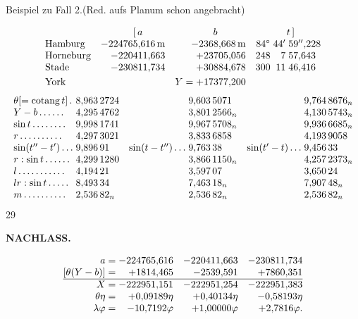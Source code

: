 \medskip
{\centering Beispiel zu Fall 2.\quad (Red. aufs Planum schon angebracht)\par}
\[
\begin{array}{@{}l@{\quad}r@{\quad}r@{\quad}r@{\;}r@{\;}l@{}}
 &\multicolumn{1}{c}{[\,a}&\multicolumn{1}{c}{b}
 &\multicolumn{3}{c@{}}{t\,]}\\
 \text{Hamburg}&-224765{,}616\,\mathrm{m}&-2368{,}668\,\mathrm{m}&84^\circ&44'&59''{,}228\\
 \text{Horneburg}&-220411{,}663&+23705{,}056&248&7&57{,}643\\
 \text{Stade}&-230811{,}734&+30884{,}678&300&11&46{,}416\\[3pt]
 \text{York}&&Y=+17377{,}200&&&
\end{array}
\]
\[
\resizebox{\linewidth}{!}{\(\begin{array}{@{}l@{\;}l@{\quad}r@{\;}l@{\quad}r@{\;}l@{}}
 \theta[=\operatorname{cotang}t]\,.&8{,}963\,2724&&9{,}603\,5071&&9{,}764\,8676_{n}\\
 Y-b\,.\,.\,.\,.\,.\,.&4{,}295\,4762&&3{,}801\,2566_{n}&&4{,}130\,5743_{n}\\
 \sin t\,.\,.\,.\,.\,.\,.\,.\,.&9{,}998\,1741&&9{,}967\,5708_{n}&&9{,}936\,6685_{n}\\
 r\,.\,.\,.\,.\,.\,.\,.\,.\,.\,.&4{,}297\,3021&&3{,}833\,6858&&4{,}193\,9058\\
 \sin(t''-t')\,.\,.\,.&9{,}896\,91&\sin(t-t'')\,.\,.\,.&9{,}763\,38&\sin(t'-t)\,.\,.\,.&9{,}456\,33\\
 r:\sin t\,.\,.\,.\,.\,.\,.&4{,}299\,1280&&3{,}866\,1150_{n}&&4{,}257\,2373_{n}\\
 l\,.\,.\,.\,.\,.\,.\,.\,.\,.\,.\,.&4{,}194\,21&&3{,}597\,07&&3{,}650\,24\\
 lr:\sin t\,.\,.\,.\,.\,.&8{,}493\,34&&7{,}463\,18_{n}&&7{,}907\,48_{n}\\
 m\,.\,.\,.\,.\,.\,.\,.\,.\,.\,.&2{,}536\,82_{n}&&2{,}536\,82_{n}&&2{,}536\,82_{n}
\end{array}\)}
\]
\hfill{\small 29}\hspace*{.12\linewidth}\par

\par\clearpage
\noindent{}\hfill{\small\textbf{NACHLASS.}}\hfill\null\par\medskip

\[
\begin{array}{@{}r@{\;}r@{\quad}r@{\quad}r@{}}
 a=&-224765{,}616&-220411{,}663&-230811{,}734\\
 {[}\theta(Y-b)]=&+1814{,}465&-2539{,}591&+7860{,}351\\
 \hline
 X=&-222951{,}151&-222951{,}254&-222951{,}383\\
 \theta\eta=&+0{,}09189\eta&+0{,}40134\eta&-0{,}58193\eta\\
 \lambda\varphi=&-10{,}7192\varphi&+1{,}00000\varphi&+2{,}7816\varphi.
\end{array}
\]

